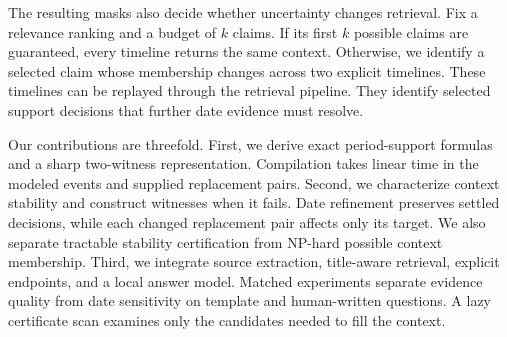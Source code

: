 The resulting masks also decide whether uncertainty changes retrieval.
Fix a relevance ranking and a budget of $k$ claims.
If its first $k$ possible claims are guaranteed, every timeline returns the same context.
Otherwise, we identify a selected claim whose membership changes across two explicit timelines.
These timelines can be replayed through the retrieval pipeline.
They identify selected support decisions that further date evidence must resolve.

Our contributions are threefold.
First, we derive exact period-support formulas and a sharp two-witness representation.
Compilation takes linear time in the modeled events and supplied replacement pairs.
Second, we characterize context stability and construct witnesses when it fails.
Date refinement preserves settled decisions, while each changed replacement pair affects only its target.
We also separate tractable stability certification from NP-hard possible context membership.
Third, we integrate source extraction, title-aware retrieval, explicit endpoints, and a local answer model.
Matched experiments separate evidence quality from date sensitivity on template and human-written questions.
A lazy certificate scan examines only the candidates needed to fill the context.

